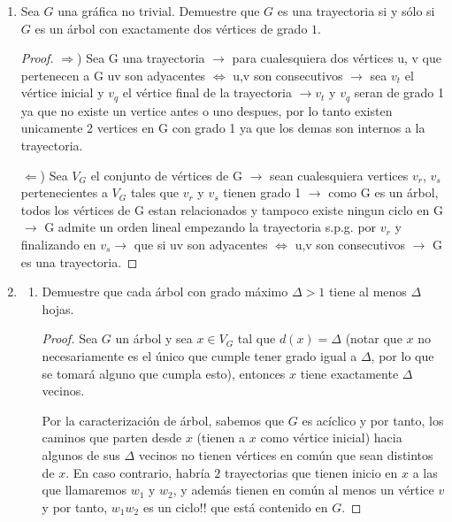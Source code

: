 \documentclass{article}
\begin{document}
\begin{enumerate}
  \item Sea $G$ una gr\'afica no trivial.   Demuestre
    que $G$ es una trayectoria si y s\'olo si $G$ es
    un \'arbol con exactamente dos v\'ertices de
    grado $1$.
    
    \begin{proof} 


      $\Longrightarrow$) Sea G una trayectoria $\rightarrow$ para cualesquiera dos vértices u, v que pertenecen  a G uv son adyacentes $\Leftrightarrow$ u,v son consecutivos  $\rightarrow$ sea $v_t$ el  vértice inicial y $v_q$ el  vértice final de la trayectoria  $\rightarrow  v_t$ y $v_q$ seran de grado 1 ya que no existe un vertice antes o uno despues, por lo tanto existen unicamente 2 vertices en G con grado 1 ya que los demas son internos a la trayectoria.
      
      $\Longleftarrow$) Sea  $V_G$ el conjunto de vértices de G $\rightarrow$ sean cualesquiera vertices $v_r$, $v_s$ pertenecientes a $V_G$ tales que $v_r$ y $v_s$ tienen grado 1 $\rightarrow$  como G es un árbol, todos los vértices de G estan relacionados y tampoco existe ningun  ciclo en G $\rightarrow$  G admite un orden lineal empezando la trayectoria s.p.g. por $v_r$ y finalizando en $v_s \rightarrow$ que si uv son adyacentes  $\Leftrightarrow$ u,v son consecutivos  $\rightarrow$ G es una trayectoria.
      
      
      \end{proof}
   

    \item \begin{enumerate}
      \item Demuestre que cada \'arbol con grado m\'aximo
        $\Delta > 1$ tiene al menos $\Delta$ hojas.

        \renewcommand\qedsymbol{QED}
        \begin{proof}
          Sea $G$ un \'arbol y sea $x \in V_G$ tal que $d(x) = \Delta$ (notar que $x$
          no necesariamente es el \'unico que cumple tener grado igual a $\Delta$, por
          lo que se tomar\'a alguno que cumpla esto), entonces $x$ tiene exactamente
          $\Delta$ vecinos.

          Por la caracterizaci\'on de \'arbol, sabemos que $G$ es ac\'iclico
          y por tanto, los caminos que parten desde $x$ (tienen a $x$
          como v\'ertice inicial) hacia algunos de sus $\Delta$ vecinos no tienen
          v\'ertices en com\'un que sean distintos de $x$. En caso contrario, habr\'ia $2$
          trayectorias que tienen inicio en $x$ a las que llamaremos $w_1$ y $w_2$, y
          adem\'as tienen en com\'un al menos un v\'ertice $v$ y por tanto, $w_1 w_2$ es
          un ciclo!! que est\'a contenido en $G$.


\end{proof}
\end{enumerate}
\end{enumerate}
\end{document}
